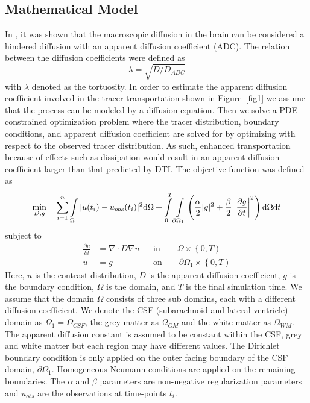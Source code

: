 \documentclass[11pt,a4paper]{article}
\begin{document}
\subsection{Mathematical Model}
In \citet{sykova2008diffusion}, it was shown that the macroscopic diffusion in the brain can be considered a hindered diffusion with an apparent diffusion coefficient (ADC). The relation between the diffusion coefficients were defined as 
\begin{equation}
 \lambda =  \sqrt {D/D_{ADC}}
\label{tortuosity}
\end{equation}
with $\lambda$ denoted as the tortuosity.
In order to estimate the apparent diffusion coefficient involved in the tracer transportation shown in Figure~\ref{fig1} we assume that the process can be modeled by a diffusion equation. Then we solve a PDE constrained optimization problem where
the tracer distribution, boundary conditions, and apparent
diffusion coefficient are solved for by optimizing with
respect to the observed tracer distribution. As such, enhanced transportation because of effects such as
dissipation would result in an apparent diffusion coefficient larger than that predicted by DTI.  
The objective function was defined as 
\begin{equation}
\min_{D,g} \quad \sum\limits_{i=1}\sp{n} \int\limits_{\Omega} |u(t_i) - u_{obs}(t_i)|\sp{2} \mathrm{d}\Omega + \int\limits_{0}\sp{T} \int\limits_{\partial \Omega_1} \left( \frac{\alpha}{2} | g |\sp{2} + \frac{\beta}{2} \left| \frac{\partial g}{\partial t} \right|\sp{2} \right) \mathrm{d}\Omega \mathrm{d}t  
\label{EQ::objf}
\end{equation}
subject to   
\begin{equation}
\begin{aligned}
\frac{\partial u}{\partial t} &= \nabla \cdot  D \nabla u && \text{in} \qquad \Omega \times \left\lbrace 0 , T \right)  \\
u&=g && \text{on} \qquad \partial\Omega_1  \times \left\lbrace 0 , T \right) 
\end{aligned}
\label{Eq::PDE}
\end{equation}
Here, $u$ is the contrast distribution, $D$ is the apparent diffusion 
coefficient, $g$ is the boundary condition, $\Omega$ is the domain, and $T$ is the final simulation time. We assume that the domain $\Omega$ consists of three sub domains, each with a different diffusion coefficient. We denote the CSF (subarachnoid and lateral ventricle) domain as $\Omega_1=\Omega_{CSF}$, the grey matter as $\Omega_{GM}$ and the white matter as $\Omega_{WM}$. 
The apparent
diffusion constant is assumed to be constant within the CSF, grey and 
white matter but each region may have different values.  
The Dirichlet boundary condition is only applied on the outer facing boundary of the CSF domain, $\partial \Omega_1$. Homogeneous Neumann conditions are applied on the remaining boundaries.
The $\alpha$ and $\beta$ parameters are non-negative regularization parameters 
and $u_{obs}$ are the observations at time-points $t_i$. 
\end{document}
